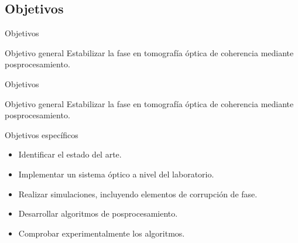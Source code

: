 \documentclass[fleqn,10pt]{beamer}
\begin{document}
\subsection{Objetivos}
\begin{frame}{Objetivos}
	\begin{block}{Objetivo general}
		{\normalsize Estabilizar la fase en tomografía óptica de coherencia mediante posprocesamiento.}
	\end{block}
\end{frame}

	\addtocounter{framenumber}{-1}
\begin{frame}{Objetivos}
	\begin{block}{Objetivo general}
		{\normalsize Estabilizar la fase en tomografía óptica de coherencia mediante posprocesamiento.}
	\end{block}
	
	\begin{block}{Objetivos específicos}
		\begin{itemize}
			\item<1-> {\color{blue} Identificar el estado del arte.}
			\item<2-> {\color{green!40!black!60} Implementar un sistema óptico a nivel del laboratorio.}
			\item<3-> {\color{magenta} Realizar simulaciones, incluyendo elementos de corrupción de fase.}
			\item<4-> {\color{cyan} Desarrollar algoritmos de posprocesamiento.}
			\item<5-> {\color{teal} Comprobar experimentalmente los algoritmos.}
		\end{itemize}
		
	\end{block}
\end{frame}
\end{document}
